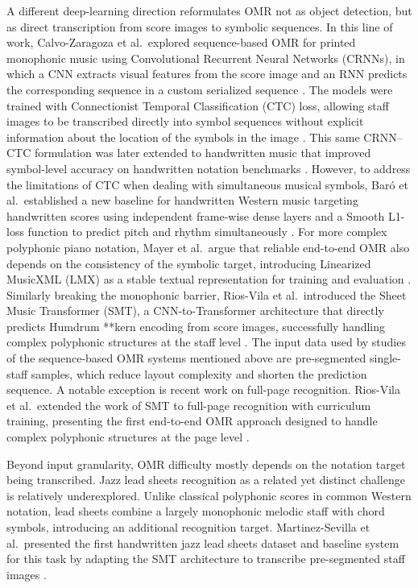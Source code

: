 \documentclass{article}
\begin{document}
A different deep-learning direction reformulates OMR not as object detection, but as direct transcription from score images to symbolic sequences. In this line of work, Calvo-Zaragoza et al.\ explored sequence-based OMR for printed monophonic music using Convolutional Recurrent Neural Networks (CRNNs), in which a CNN extracts visual features from the score image and an RNN predicts the corresponding sequence in a custom serialized sequence \cite{calvo-zaragoza2018end}. The models were trained with Connectionist Temporal Classification (CTC) loss, allowing staff images to be transcribed directly into symbol sequences without explicit information about the location of the symbols in the image \cite{alfaro-contreras2023homophonic}. This same CRNN--CTC formulation was later extended to handwritten music that improved symbol-level accuracy on handwritten notation benchmarks \cite{calvo-zaragoza_handwritten_2019}. However, to address the limitations of CTC when dealing with simultaneous musical symbols, Baró et al.\ established a new baseline for handwritten Western music targeting handwritten scores using independent frame-wise dense layers and a Smooth L1-loss function to predict pitch and rhythm simultaneously \cite{baro_optical_2019}. For more complex polyphonic piano notation, Mayer et al.\ argue that reliable end-to-end OMR also depends on the consistency of the symbolic target, introducing Linearized MusicXML (LMX) as a stable textual representation for training and evaluation \cite{mayer_practical_2024}. Similarly breaking the monophonic barrier, Rios-Vila et al.\ introduced the Sheet Music Transformer (SMT), a CNN-to-Transformer architecture that directly predicts Humdrum **kern encoding from score images, successfully handling complex polyphonic structures at the staff level \cite{rios-vila_sheet_2024}. The input data used by studies of the sequence-based OMR systems mentioned above are pre-segmented single-staff samples, which reduce layout complexity and shorten the prediction sequence. A notable exception is recent work on full-page recognition. Rios-Vila et al.\ extended the work of SMT to full-page recognition with curriculum training, presenting the first end-to-end OMR approach designed to handle complex polyphonic structures at the page level \cite{RiosVila2026FullPageOMR}.


Beyond input granularity, OMR difficulty mostly depends on the notation target being transcribed. Jazz lead sheets recognition as a related yet distinct challenge is relatively underexplored. Unlike classical polyphonic scores in common Western notation, lead sheets combine a largely monophonic melodic staff with chord symbols, introducing an additional recognition target. Martinez-Sevilla et al.\ presented the first handwritten jazz lead sheets dataset and baseline system for this task by adapting the SMT architecture to transcribe pre-segmented staff images \cite{martinez-sevilla_optical_2025}. 
\end{document}
